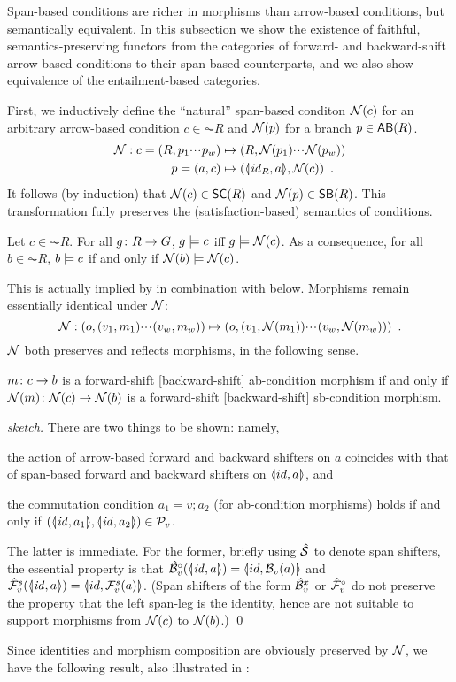 Span-based conditions are richer in morphisms than arrow-based conditions, but semantically equivalent. In this subsection we show the existence of faithful, semantics-preserving functors from the categories of forward- and backward-shift arrow-based conditions to their span-based counterparts, and we also show equivalence of the entailment-based categories.

First, we inductively define the ``natural'' span-based conditon $\mathcal{N}(c)$ for an arbitrary arrow-based condition $c\in \AC R$ and $\mathcal{N}(p)$ for a branch $p\in \AB R$. 
\begin{align*}
\cN: c = (R,p_1\ccdots p_w) & \mapsto (R,\cN(p_1)\ccdots \cN(p_w)) \\
      p=(a,c) & \mapsto (\spanof{\id_R}{a},\cN(c)) \enspace.
\end{align*}
%
It follows (by induction) that $\cN(c)\in \SC R$ and $\cN(p)\in \SB R$. This transformation fully preserves the (satisfaction-based) semantics of conditions.

\begin{proposition}
Let $c\in \AC R$. For all $g\colon R\rightarrow G$, $g\models c$ iff $g\models\mathcal{N}(c)$. As a consequence, for all $b\in \AC R$, $b\models c$ if and only if $\mathcal{N}(b)\models \mathcal{N}(c)$.
\end{proposition}
%
This is actually implied by  in combination with  below. Morphisms remain essentially identical under $\mathcal{N}$:
%
\[ \mathcal{N}: (o,(v_1,m_1){\cdotp\mkern-2mu\cdotp\mkern-2mu\cdotp\mkern1mu} (v_w,m_w)) \mapsto (o,(v_1,\mathcal{N}(m_1)){\cdotp\mkern-2mu\cdotp\mkern-2mu\cdotp\mkern1mu} (v_w,\mathcal{N}(m_w))) \enspace. \]
%
$\mathcal{N}$ both preserves and reflects morphisms, in the following sense.
%
\begin{proposition}
$m\colon c\rightarrow b$ is a forward-shift [backward-shift] ab-condition morphism if and only if $\mathcal{N}(m)\colon \mathcal{N}(c)\rightarrow \mathcal{N}(b)$ is a forward-shift [backward-shift] sb-condition morphism.
\end{proposition}
%
\begin{proof}[sketch]
There are two things to be shown: namely,
\begin{enumerate*}[label=\emph{(\roman*)}]
\item the action of arrow-based forward and backward shifters on $a$ coincides with that of span-based forward and backward shifters on $\spanof{id}{a}$, and
\item the commutation condition $a_1=v;a_2$ (for ab-condition morphisms) holds if and only if $(\spanof{\id}{a_1},\spanof{\id}{a_2})\in \cP_v$.
\end{enumerate*}
The latter is immediate. For the former, briefly using $\hat {\mathcal{S}}$ to denote span shifters, the essential property is that $\hat\cB_v^\circ(\spanof{\id}{a})=\spanof{id}{\cB_v(a)}$ and $\hat\cF_v^s(\spanof{\id}{a})=\spanof{id}{\cF_v^s(a)}$. (Span shifters of the form $\hat{\mathcal{B}}_v^x$ or $\hat{\mathcal{F}}_v^\circ$ do not preserve the property that the left span-leg is the identity, hence are not suitable to support morphisms from $\mathcal{N}(c)$ to $\mathcal{N}(b)$.)
\qed
\end{proof}
%
Since identities and morphism composition are obviously preserved by $\mathcal{N}$, we have the following result, also illustrated in :

